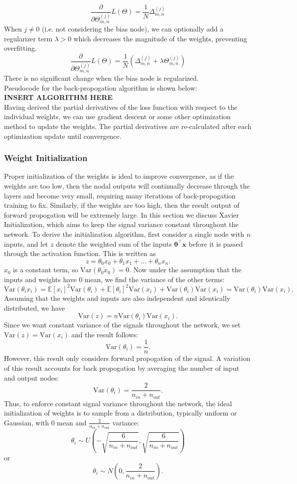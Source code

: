\documentclass[a4paper,12pt]{article}
\newcommand{\E}{\mathbb{E}}
\newcommand{\Var}{\mathrm{Var}}
\begin{document}
\[\frac{\partial}{\partial \Theta^{(j)}_{m,n}}L(\Theta)=\frac1N \Delta_{m,n}^{(j)}\]
When $j\neq0$ (i.e. not considering the bias node), we can optionally add a regularizer term $\lambda > 0$ which decreases the magnitude of the weights, preventing overfitting. 
\[\frac{\partial}{\partial \Theta^{(j)}_{m,n}}L(\Theta)=\frac1N (\Delta_{m,n}^{(j)}+\lambda \Theta_{m,n}^{(j)})\]
There is no significant change when the bias node is regularized.\\
Pseudocode for the back-propogation algorithm is shown below:\\
\textbf{INSERT ALGORITHM HERE}\\
Having derived the partial derivatives of the loss function with respect to the individual weights, we can use gradient descent or some other optimization method to update the weights. The partial derivatives are re-calculated after each optimization update until convergence.
\subsubsection{Weight Initialization}
Proper initialization of the weights is ideal to improve convergence, as if the weights are too low, then the nodal outputs will continually decrease through the layers and become very small, requiring many iterations of back-propogation training to fix. Similarly, if the weights are too high, then the result output of forward propogation will be extremely large. In this section we discuss Xavier Initialization, which aims to keep the signal variance constant throughout the network. To derive the initialization algorithm, first consider a single node with $n$ inputs, and let $z$ denote the weighted sum of the inputs $\bm{\theta}^\top\textbf{x}$ before it is passed through the activation function. This is written as
\[z=\theta_0x_0+\theta_1x_1+\dots+\theta_nx_n.\]
$x_0$ is a constant term, so $\Var(\theta_0x_0)=0$. Now under the assumption that the inputs and weights have 0 mean, we find the variance of the other terms:
\[\Var(\theta_ix_i)=\E[x_i]^2\Var(\theta_i)+\E[\theta_i]^2\Var(x_i)+\Var(\theta_i)\Var(x_i)=\Var(\theta_i)\Var(x_i).\]
Assuming that the weights and inputs are also independent and identically distributed, we have
\[\Var(z)=n\Var(\theta_i)\Var(x_i).\]
Since we want constant variance of the signals throughout the network, we set $\Var(z)=\Var(x_i)$ and the result follows:
\[\Var(\theta_i)=\frac1n.\]
However, this result only considers forward propogation of the signal. A variation of this result accounts for back propogation by averaging the number of input and output nodes:
\[\Var(\theta_i)=\frac{2}{n_{in}+n_{out}}.\]
Thus, to enforce constant signal variance throughout the network, the ideal initialization of weights is to sample from a distribution, typically uniform or Gaussian, with $0$ mean and $\frac{2}{n_{in}+n_{out}}$ variance:
\[\theta_i\sim U\left(-\sqrt{\frac{6}{n_{in}+n_{out}}},\sqrt{\frac{6}{n_{in}+n_{out}}}\right)\]
or
\[\theta_i\sim N\left(0,\frac{2}{n_{in}+n_{out}}\right).\]
\end{document}
